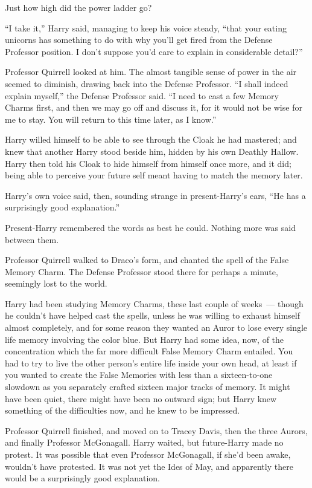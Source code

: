 Just how high did the power ladder go?

``I take it,'' Harry said, managing to keep his voice steady, ``that your eating unicorns has something to do with why you'll get fired from the Defense Professor position. I don't suppose you'd care to explain in considerable detail?''

Professor Quirrell looked at him. The almost tangible sense of power in the air seemed to diminish, drawing back into the Defense Professor. ``I shall indeed explain myself,'' the Defense Professor said. ``I need to cast a few Memory Charms first, and then we may go off and discuss it, for it would not be wise for me to stay. You will return to this time later, as I know.''

Harry willed himself to be able to see through the Cloak he had mastered; and knew that another Harry stood beside him, hidden by his own Deathly Hallow. Harry then told his Cloak to hide himself from himself once more, and it did; being able to perceive your future self meant having to match the memory later.

Harry's own voice said, then, sounding strange in present-Harry's ears, ``He has a surprisingly good explanation.''

Present-Harry remembered the words as best he could. Nothing more was said between them.

Professor Quirrell walked to Draco's form, and chanted the spell of the False Memory Charm. The Defense Professor stood there for perhaps a minute, seemingly lost to the world.

Harry had been studying Memory Charms, these last couple of weeks~--- though he couldn't have helped cast the spells, unless he was willing to exhaust himself almost completely, and for some reason they wanted an Auror to lose every single life memory involving the color blue. But Harry had some idea, now, of the concentration which the far more difficult False Memory Charm entailed. You had to try to live the other person's entire life inside your own head, at least if you wanted to create the False Memories with less than a sixteen-to-one slowdown as you separately crafted sixteen major tracks of memory. It might have been quiet, there might have been no outward sign; but Harry knew something of the difficulties now, and he knew to be impressed.

Professor Quirrell finished, and moved on to Tracey Davis, then the three Aurors, and finally Professor McGonagall. Harry waited, but future-Harry made no protest. It was possible that even Professor McGonagall, if she'd been awake, wouldn't have protested. It was not yet the Ides of May, and apparently there would be a surprisingly good explanation.


